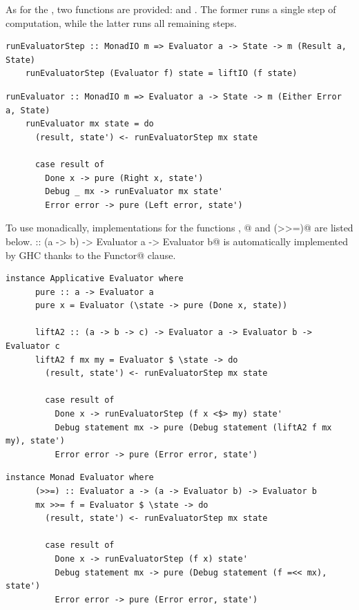 \documentclass[UdineBachThesis,american,11pt,draft]{PhdThesis}
\begin{document}
  As for the \lstinline@Evaluator@, two functions are provided:
  \lstinline@runEvaluatorStep@ and \lstinline@runEvaluator@. The former runs a
  single step of computation, while the latter runs all remaining steps.

  \begin{lstlisting}[gobble=4,basicstyle=\ttfamily\small]
    runEvaluatorStep :: MonadIO m => Evaluator a -> State -> m (Result a, State)
    runEvaluatorStep (Evaluator f) state = liftIO (f state)
  \end{lstlisting}

  \begin{lstlisting}[gobble=4,basicstyle=\ttfamily\small]
    runEvaluator :: MonadIO m => Evaluator a -> State -> m (Either Error a, State)
    runEvaluator mx state = do
      (result, state') <- runEvaluatorStep mx state

      case result of
        Done x -> pure (Right x, state')
        Debug _ mx -> runEvaluator mx state'
        Error error -> pure (Left error, state')
  \end{lstlisting}

  To use \lstinline@Evaluator@s monadically, implementations for the functions
  \lstinline@pure@, @ and \lstinline@(>>=)@ are listed below.
  \lstinline@fmap :: (a -> b) -> Evaluator a -> Evaluator b@ is automatically
  implemented by GHC thanks to the \lstinline@deriving Functor@ clause.

  \begin{lstlisting}[gobble=4,basicstyle=\ttfamily\small]
    instance Applicative Evaluator where
      pure :: a -> Evaluator a
      pure x = Evaluator (\state -> pure (Done x, state))

      liftA2 :: (a -> b -> c) -> Evaluator a -> Evaluator b -> Evaluator c
      liftA2 f mx my = Evaluator $ \state -> do
        (result, state') <- runEvaluatorStep mx state

        case result of
          Done x -> runEvaluatorStep (f x <$> my) state'
          Debug statement mx -> pure (Debug statement (liftA2 f mx my), state')
          Error error -> pure (Error error, state')
  \end{lstlisting}

  \begin{lstlisting}[gobble=4,basicstyle=\ttfamily\small]
    instance Monad Evaluator where
      (>>=) :: Evaluator a -> (a -> Evaluator b) -> Evaluator b
      mx >>= f = Evaluator $ \state -> do
        (result, state') <- runEvaluatorStep mx state

        case result of
          Done x -> runEvaluatorStep (f x) state'
          Debug statement mx -> pure (Debug statement (f =<< mx), state')
          Error error -> pure (Error error, state')
  \end{lstlisting}
\end{document}
